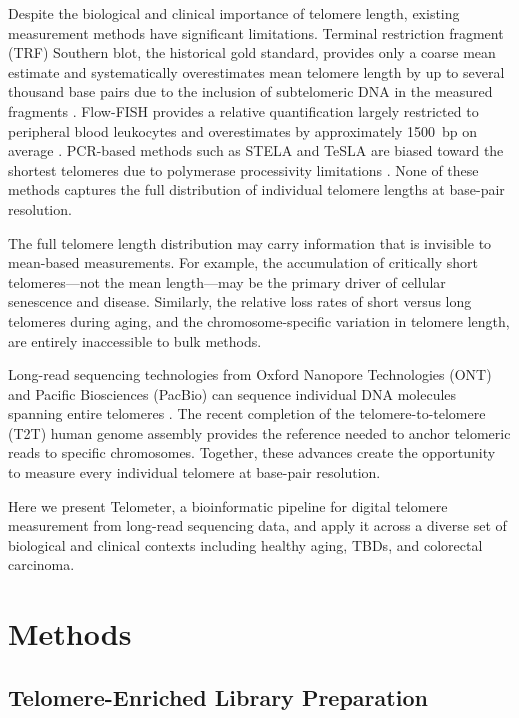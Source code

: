 \documentclass[11pt]{article}
\begin{document}
Despite the biological and clinical importance of telomere length, existing measurement methods have significant limitations. Terminal restriction fragment (TRF) Southern blot, the historical gold standard, provides only a coarse mean estimate and systematically overestimates mean telomere length by up to several thousand base pairs due to the inclusion of subtelomeric DNA in the measured fragments \citep{lansdorp2022heterogeneity}. Flow-FISH provides a relative quantification largely restricted to peripheral blood leukocytes and overestimates by approximately 1500~bp on average \citep{alder2018diagnostic}. PCR-based methods such as STELA and TeSLA are biased toward the shortest telomeres due to polymerase processivity limitations \citep{baird2003extensive}. None of these methods captures the full distribution of individual telomere lengths at base-pair resolution.

The full telomere length distribution may carry information that is invisible to mean-based measurements. For example, the accumulation of critically short telomeres---not the mean length---may be the primary driver of cellular senescence and disease. Similarly, the relative loss rates of short versus long telomeres during aging, and the chromosome-specific variation in telomere length, are entirely inaccessible to bulk methods.

Long-read sequencing technologies from Oxford Nanopore Technologies (ONT) and Pacific Biosciences (PacBio) can sequence individual DNA molecules spanning entire telomeres \citep{jain2018nanopore}. The recent completion of the telomere-to-telomere (T2T) human genome assembly \citep{nurk2022complete} provides the reference needed to anchor telomeric reads to specific chromosomes. Together, these advances create the opportunity to measure every individual telomere at base-pair resolution.

Here we present Telometer, a bioinformatic pipeline for digital telomere measurement from long-read sequencing data, and apply it across a diverse set of biological and clinical contexts including healthy aging, TBDs, and colorectal carcinoma.

\section{Methods}

\subsection{Telomere-Enriched Library Preparation}
\end{document}
